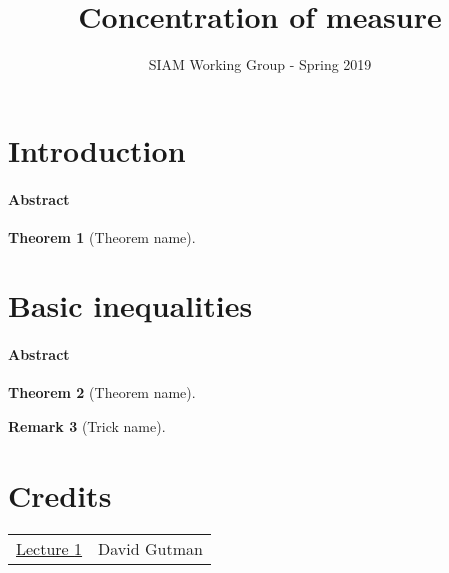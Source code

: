 \documentclass{amsproc}
\title{Concentration of measure}
\author{SIAM Working Group - Spring 2019}
\newtheorem{theorem}{Theorem}
\newtheorem{remark}[theorem]{Remark}
\newcommand{\fref}[2]{\hyperref[#2]{#1 \ref*{#2}}}
\begin{document}
\maketitle
\tableofcontents


\section{Introduction}
\label{sec:introduction}
\paragraph{\textbf{Abstract}}
\lipsum[1]

\begin{theorem}[Theorem name]
\label{thm:reference-name}
\end{theorem}


\section{Basic inequalities}
\label{sec:basic_inequalites}
\paragraph{\textbf{Abstract}}
\lipsum[1]

\begin{theorem}[Theorem name]
\label{thm:reference-name}
\end{theorem}

\begin{remark}[Trick name]
\label{rmk:reference-name}
\end{remark}


\appendix
\newpage
\section*{Credits}
\begin{tabular}{ll}
	\fref{Lecture}{sec:introduction}
	&David Gutman
\end{tabular}
\end{document}
